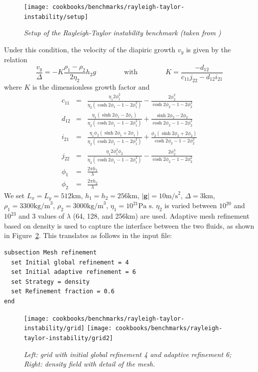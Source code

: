 \documentclass{article}
\begin{document}
\begin{figure}
  \centering
  \texttt{[image: cookbooks/benchmarks/rayleigh-taylor-instability/setup]}
  \caption{\it Setup of the Rayleigh-Taylor instability benchmark (taken from \cite{thie11})} 
  \label{fig:RTi_setup}
\end{figure}

Under this condition, the velocity of the diapiric growth
$v_y$ is given by the relation
\begin{equation}
\frac{v_y}{\Delta} = - K \frac{\rho_1-\rho_2}{2 \eta_2} h_2 g
\qquad
\qquad
\text{with}
\qquad
\qquad
K=\frac{-d_{12}}{c_{11}j_{22}-d_{12}i_{21}}
\end{equation}
where $K$ is the dimensionless growth factor and 
\begin{eqnarray}
c_{11} &=& \frac{\eta_1 2 \phi_1^2}{\eta_2(\cosh 2\phi_1 - 1 - 2\phi_1^2)} - \frac{2\phi_2^2}{\cosh 2\phi_2 - 1 - 2 \phi_2^2}\\
d_{12} &=& \frac{\eta_1(\sinh 2\phi_1 -2\phi_1)}{\eta_2(\cosh 2\phi_1 -1 -2\phi_1^2)} + \frac{\sinh 2\phi_2 - 2\phi_2}{\cosh 2\phi_2 -1 -2\phi_2^2} \\
i_{21} &=& \frac{\eta_1\phi_2 (\sinh 2 \phi_1 + 2 \phi_1)}{\eta_2(\cosh 2\phi_1 -1 -2\phi_1^2)} 
+ \frac{\phi_2 (\sinh 2\phi_2 + 2\phi_2)}{\cosh 2\phi_2 -1 -2\phi_2^2} \\
j_{22} &=& \frac{\eta_1 2 \phi_1^2 \phi_2}{\eta_2(\cosh 2\phi_1 -1-2\phi_1^2)} - \frac{2\phi_2^3}{ \cosh 2\phi_2 -1 -2\phi_2^2}\\
\phi_1&=&\frac{2\pi h_1}{\lambda} \\
\phi_2&=&\frac{2\pi h_2}{\lambda}
\end{eqnarray}
We set $L_x=L_y=512\text{km}$, $h_1=h_2=256\text{km}$, $|\boldsymbol{g}|=10\text{m/s}^2$, $\Delta=3\text{km}$, 
$\rho_1=3300\text{kg/m}^3$, $\rho_2=3000\text{kg/m}^3$, $\eta_1=10^{21}\text{Pa s}$. $\eta_2$ is varied between $10^{20}$ and $10^{23}$ 
and 3 values of $\lambda$ (64, 128, and 256km) are used. 
Adaptive mesh refinement based on density is used to capture the interface between the two 
fluids, as shown in Figure~\ref{fig:RTi_grids}. This translates as follows in the input file:
\begin{verbatim}
subsection Mesh refinement
  set Initial global refinement = 4
  set Initial adaptive refinement = 6
  set Strategy = density
  set Refinement fraction = 0.6
end
\end{verbatim}

\begin{figure}
  \centering
  \texttt{[image: cookbooks/benchmarks/rayleigh-taylor-instability/grid]}
  \texttt{[image: cookbooks/benchmarks/rayleigh-taylor-instability/grid2]}
  \caption{\it Left: grid with initial global refinement 4 and adaptive refinement 6; Right: density field with detail of the mesh.} 
  \label{fig:RTi_grids}
\end{figure}
\end{document}
